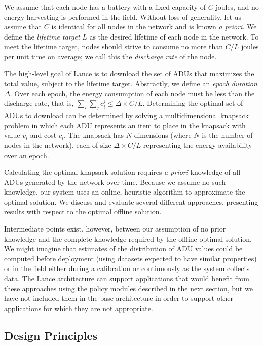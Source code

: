 We assume that each node has a battery with a fixed capacity of $C$ joules,
and no energy harvesting is performed in the field. Without loss of
generality, let us assume that $C$ is identical for all nodes in the network
and is known \textit{a priori}. We define the \textit{lifetime target} $L$
as the desired lifetime of each node in the network. To meet the lifetime
target, nodes should strive to consume no more than $C/L$ joules per unit
time on average; we call this the \textit{discharge rate} of the node.

The high-level goal of Lance is to download the set of ADUs that maximizes
the total value, subject to the lifetime target. Abstractly, we define an
\textit{epoch duration} $\Delta$. Over each epoch, the energy consumption of
each node must be less than the discharge rate, that is, $\sum_i \sum_j c_i^j
\leq \Delta \times C/L$. Determining the optimal set of ADUs to download can
be determined by solving a multidimensional knapsack problem in which each
ADU represents an item to place in the knapsack with value $v_i$ and cost
$\bar{c}_i$. The knapsack has $N$ dimensions (where $N$ is the number of
nodes in the network), each of size $\Delta \times C/L$ representing the
energy availability over an epoch.

Calculating the optimal knapsack solution requires \textit{a priori}
knowledge of all ADUs generated by the network over time. Because we assume
no such knowledge, our system uses an online, heuristic algorithm to
approximate the optimal solution. We discuss and evaluate several different
approaches, presenting results with respect to the optimal offline solution.

Intermediate points exist, however, between our assumption of no prior
knowledge and the complete knowledge required by the offline optimal
solution. We might imagine that estimates of the distribution of ADU values
could be computed before deployment (using datasets expected to have similar
properties) or in the field either during a calibration or continuously as
the system collects data. The Lance architecture can support applications
that would benefit from these approaches using the policy modules described
in the next section, but we have not included them in the base architecture
in order to support other applications for which they are not appropriate.

\subsection{Design Principles}

